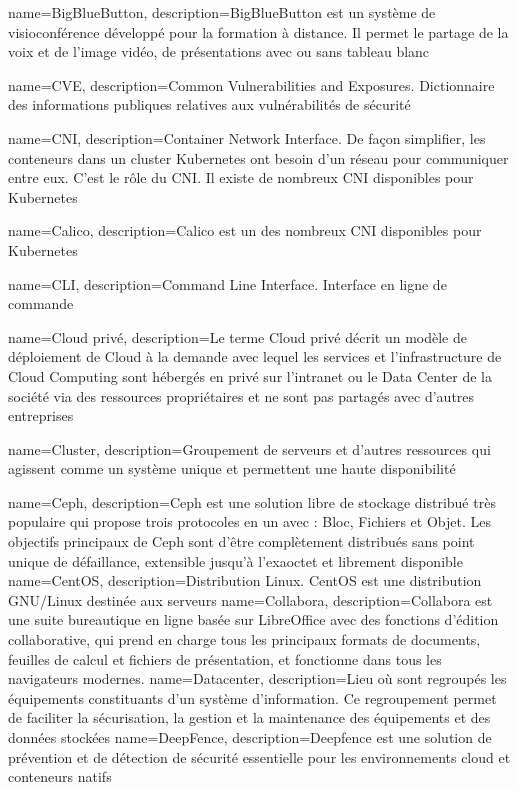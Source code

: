 {
    name=BigBlueButton,
    description={BigBlueButton est un système de visioconférence développé pour la formation à distance. Il permet le partage de la voix et de l'image vidéo, de présentations avec ou sans tableau blanc}
}

{
    name=CVE,
    description={Common Vulnerabilities and Exposures. Dictionnaire des informations publiques relatives aux vulnérabilités de sécurité}
}

{
    name=CNI,
    description={Container Network Interface. De façon simplifier, les conteneurs dans un cluster Kubernetes ont besoin d'un réseau pour communiquer entre eux. C'est le rôle du CNI. Il existe de nombreux CNI disponibles pour Kubernetes}
}

{
    name=Calico,
    description={Calico est un des nombreux CNI disponibles pour Kubernetes}
}

{
    name=CLI,
    description={Command Line Interface. Interface en ligne de commande}
}

{
    name=Cloud privé,
    description={Le terme Cloud privé décrit un modèle de déploiement de Cloud à la demande avec lequel les services et l'infrastructure de Cloud Computing sont hébergés en privé sur l'intranet ou le Data Center de la société via des ressources propriétaires et ne sont pas partagés avec d'autres entreprises}
}

{
    name=Cluster,
    description={Groupement de serveurs et d’autres ressources qui agissent comme un système unique et permettent une haute disponibilité}
}

{
    name=Ceph,
    description={Ceph est une solution libre de stockage distribué très populaire qui propose trois protocoles en un avec : Bloc, Fichiers et Objet. Les objectifs principaux de Ceph sont d'être complètement distribués sans point unique de défaillance, extensible jusqu'à l'exaoctet et librement disponible}
}
{
    name=CentOS,
    description={Distribution Linux. CentOS est une distribution GNU/Linux destinée aux serveurs}
}
{
    name=Collabora,
    description={Collabora est une suite bureautique en ligne basée sur LibreOffice avec des fonctions d'édition collaborative, qui prend en charge tous les principaux formats de documents, feuilles de calcul et fichiers de présentation, et fonctionne dans tous les navigateurs modernes.}
}
{
    name=Datacenter,
    description={Lieu où sont regroupés les équipements constituants d'un système d'information. Ce regroupement permet de faciliter la sécurisation, la gestion et la maintenance des équipements et des données stockées}
}
{
    name=DeepFence,
    description={Deepfence est une solution de prévention et de détection de sécurité essentielle pour les environnements cloud et conteneurs natifs}
}

